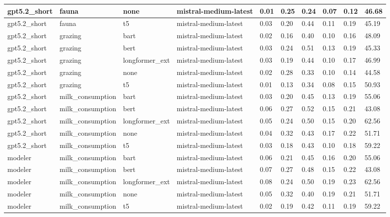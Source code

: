 \begin{tabular}{|l|l|l|l|l|l|l|l|l|l|}
 \hline
 gpt5.2\_short & fauna & none & mistral-medium-latest & 0.01 & 0.25 & 0.24 & 0.07 & 0.12 & 46.68 \\
 \hline
 gpt5.2\_short & fauna & t5 & mistral-medium-latest & 0.03 & 0.20 & 0.44 & 0.11 & 0.19 & 45.19 \\
 \hline
 gpt5.2\_short & grazing & bart & mistral-medium-latest & 0.02 & 0.16 & 0.40 & 0.10 & 0.16 & 48.09 \\
 \hline
 gpt5.2\_short & grazing & bert & mistral-medium-latest & 0.03 & 0.24 & 0.51 & 0.13 & 0.19 & 45.33 \\
 \hline
 gpt5.2\_short & grazing & longformer\_ext & mistral-medium-latest & 0.03 & 0.19 & 0.44 & 0.10 & 0.17 & 46.99 \\
 \hline
 gpt5.2\_short & grazing & none & mistral-medium-latest & 0.02 & 0.28 & 0.33 & 0.10 & 0.14 & 44.58 \\
 \hline
 gpt5.2\_short & grazing & t5 & mistral-medium-latest & 0.01 & 0.13 & 0.34 & 0.08 & 0.15 & 50.93 \\
 \hline
 gpt5.2\_short & milk\_consumption & bart & mistral-medium-latest & 0.03 & 0.20 & 0.45 & 0.13 & 0.19 & 55.06 \\
 \hline
 gpt5.2\_short & milk\_consumption & bert & mistral-medium-latest & 0.06 & 0.27 & 0.52 & 0.15 & 0.21 & 43.08 \\
 \hline
 gpt5.2\_short & milk\_consumption & longformer\_ext & mistral-medium-latest & 0.05 & 0.24 & 0.50 & 0.15 & 0.20 & 62.56 \\
 \hline
 gpt5.2\_short & milk\_consumption & none & mistral-medium-latest & 0.04 & 0.32 & 0.43 & 0.17 & 0.22 & 51.71 \\
 \hline
 gpt5.2\_short & milk\_consumption & t5 & mistral-medium-latest & 0.03 & 0.18 & 0.43 & 0.10 & 0.18 & 59.22 \\
 \hline
 modeler & milk\_consumption & bart & mistral-medium-latest & 0.06 & 0.21 & 0.45 & 0.16 & 0.20 & 55.06 \\
 \hline
 modeler & milk\_consumption & bert & mistral-medium-latest & 0.07 & 0.27 & 0.48 & 0.15 & 0.22 & 43.08 \\
 \hline
 modeler & milk\_consumption & longformer\_ext & mistral-medium-latest & 0.08 & 0.24 & 0.50 & 0.19 & 0.23 & 62.56 \\
 \hline
 modeler & milk\_consumption & none & mistral-medium-latest & 0.05 & 0.32 & 0.40 & 0.19 & 0.21 & 51.71 \\
 \hline
 modeler & milk\_consumption & t5 & mistral-medium-latest & 0.02 & 0.19 & 0.42 & 0.11 & 0.19 & 59.22 \\
\hline
\end{tabular}
